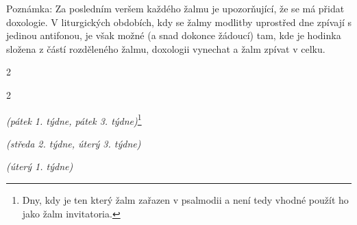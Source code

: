 \documentclass[a5paper, twoside]{article}
\newenvironment{hora}{
  \begin{multicols}{2}
}{
  \end{multicols}
}
\begin{document}
\pagestyle{empty}

\titulniStrankaSvazkuAntifonare

Poznámka: Za posledním veršem každého žalmu je  u\-po\-zor\-ňu\-jí\-cí,
že se má přidat doxologie. V liturgických obdobích, kdy se žalmy modlitby uprostřed
dne zpívají s jedinou antifonou, je však možné (a snad dokonce žádoucí)
tam, kde je hodinka složena z částí
rozděleného žalmu, doxologii vynechat a žalm zpívat v celku.

\newpage

\setlength{\columnseprule}{1pt} %
\setlength{\columnsep}{20pt} %

\fancyhead{}
\fancyhead[LE,RO]{\thepage}
\fancyfoot{}

\pagestyle{fancy}


\begin{hora}

\columnbreak

\end{hora}


\begin{hora}
\label{zalm95}




{\footnotesize \noindent \textit{(pátek 1. týdne, pátek 3. týdne)}\footnote{
Dny, kdy je ten který žalm zařazen v psalmodii a není tedy vhodné použít ho
jako žalm invitatoria.}}



{\footnotesize \noindent \textit{(středa 2. týdne, úterý 3. týdne)}}



{\footnotesize \noindent \textit{(úterý 1. týdne)}}

\end{hora}
\end{document}
